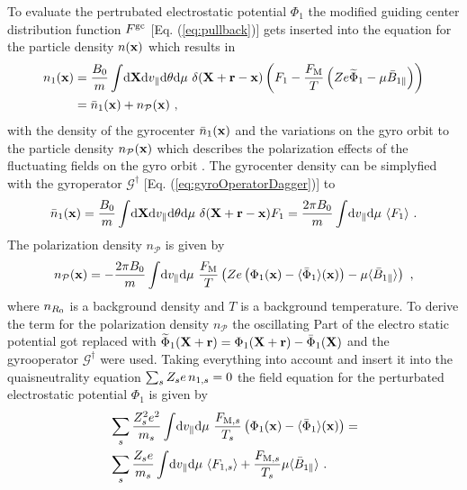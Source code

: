 To evaluate the pertrubated electrostatic potential $\Phi_1$ the modified guiding center distribution function $F^\mathrm{gc}$ [Eq. (\ref{eq:pullback})] gets inserted into the equation for the particle density $n(\boldsymbol{\mathbf{x}})$ which results in
\begin{gather}
	\begin{aligned}
		n_1(\boldsymbol{\mathbf{x}}) &= \frac{B_0}{m} \int \! \mathrm{d}\boldsymbol{\mathbf{X}}\mathrm{d}v_\parallel\mathrm{d}\theta\mathrm{d}\mu ~ \delta(\boldsymbol{\mathbf{X}} + \boldsymbol{\mathbf{r}} - \boldsymbol{\mathbf{x}}) \left(F_1 - \frac{F_\mathrm{M}}{T}\left(Ze \widetilde{\Phi}_1 - \mu \bar{B}_{1\parallel}\right) \right)\\
		     &= \bar{n}_1(\boldsymbol{\mathbf{x}}) + n_\mathcal{P}(\boldsymbol{\mathbf{x}})~,
	\end{aligned}
	\label{densityPullback}
\end{gather}
with the density of the gyrocenter $\bar{n}_1(\boldsymbol{\mathbf{x}})$ and the variations on the gyro orbit to the particle density $n_\mathcal{P}(\boldsymbol{\mathbf{x}})$ which describes the polarization effects of the fluctuating fields on the gyro orbit \cite{Brizard2007}. The gyrocenter density can be simplyfied with the gyroperator $\mathcal{G}^\dagger$ [Eq. (\ref{eq:gyroOperatorDagger})] to
\begin{gather}
		\bar{n}_1(\boldsymbol{\mathbf{x}}) = \frac{B_0}{m} \int \! \mathrm{d}\boldsymbol{\mathbf{X}}\mathrm{d}v_\parallel\mathrm{d}\theta\mathrm{d}\mu ~ \delta(\boldsymbol{\mathbf{X}} + \boldsymbol{\mathbf{r}} - \boldsymbol{\mathbf{x}}) F_1 = \frac{2\pi B_0}{m} \int \! \mathrm{d}v_\parallel\mathrm{d}\mu ~ \langle F_1\rangle~.
	\label{eq:gyrocenterDensity}
\end{gather}
The polarization density $n_\mathcal{P}$ is given by
\begin{gather}
	n_\mathcal{P}(\boldsymbol{\mathbf{x}}) =  - \frac{2\pi B_0}{m} \int \! \mathrm{d}v_\parallel\mathrm{d}\mu ~ \frac{F_\mathrm{M}}{T} \left( Ze \left(\Phi_1(\boldsymbol{\mathbf{x}}) - \langle\bar{\Phi}_1\rangle(\boldsymbol{\mathbf{x}}) \right) -  \mu \langle\bar{B}_{1\parallel}\rangle \right) ~,
	\label{eq:polarizationDensity}
\end{gather}
where $n_{R_0}$ is a background density and $T$ is a background temperature. To derive the term for the polarization density $n_\mathcal{P}$ the oscillating Part of the electro static potential got replaced with $\widetilde{\Phi}_1(\boldsymbol{\mathbf{X}}+ \boldsymbol{\mathbf{r}}) = \Phi_1(\boldsymbol{\mathbf{X}} + \boldsymbol{\mathbf{r}}) - \bar{\Phi}_1 (\boldsymbol{\mathbf{X}})$ and the gyrooperator $\mathcal{G}^\dagger$ were used. Taking everything into account and insert it into the quaisneutrality equation $\sum_s Z_s e \, n_{1,s} = 0$ the field equation for the perturbated electrostatic potential $\Phi_1$ is given by
\begin{gather}
	\begin{aligned}
		&\sum_s \frac{Z^2_s e^2}{m_s} \int \! \mathrm{d}v_\parallel\mathrm{d}\mu ~ \frac{F_{\mathrm{M},s}}{T_s} \left(\Phi_1(\boldsymbol{\mathbf{x}}) - \langle\bar{\Phi}_1\rangle(\boldsymbol{\mathbf{x}}) \right) =  \\
		&\sum_s \frac{Z_s e}{m_s} \int \! \mathrm{d}v_\parallel\mathrm{d}\mu ~ \langle F_{1,s}\rangle + \frac{F_{\mathrm{M},s}}{T_s} \mu \langle\bar{B}_{1\parallel}\rangle ~.
	\end{aligned}
	\label{eq:fieldPotential}
\end{gather}

